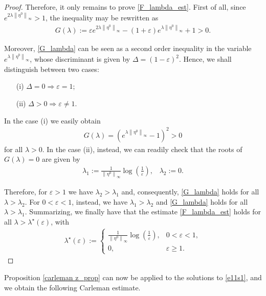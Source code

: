 \documentclass[preprint,1p]{elsarticle}
\newcommand{\D}{\displaystyle}
\newcommand{\norm}[2]{\left\|#1\right\|_{#2}}
\begin{document}
\begin{proof}
Therefore, it only remains to prove \eqref{F_lambda_est}. First of all, since $e^{2\lambda\norm{\eta^0}{\infty}}>1$, the inequality  may be rewritten as
\begin{align}\label{G_lambda}
	G(\lambda):=\varepsilon e^{2\lambda\norm{\eta^0}{\infty}} - (1+\varepsilon)e^{\lambda\norm{\eta^0}{\infty}} + 1> 0.
\end{align}

Moreover, \eqref{G_lambda} can be seen as a second order inequality in the variable $e^{\lambda\norm{\eta^0}{\infty}}$, whose discriminant is given by $\Delta = (1-\varepsilon)^2$. Hence, we shall distinguish between two cases:
\begin{itemize}
	\item[(i)] $\Delta = 0\Rightarrow \varepsilon=1$;
	\item[(ii)] $\Delta>0\Rightarrow \varepsilon\neq 1$.
\end{itemize}
In the case (i) we easily obtain 
\begin{align*}
	G(\lambda)=\left(e^{\lambda\norm{\eta^0}{\infty}}-1\right)^2>0
\end{align*} 
for all $\lambda>0$. In the case (ii), instead, we can readily check that the roots of $G(\lambda)=0$ are given by 
\begin{align*}
	\lambda_1:=\frac{1}{\norm{\eta^0}{\infty}}\log\left(\frac 1\varepsilon\right),\;\;\; \lambda_2:=0.
\end{align*}

Therefore, for $\varepsilon>1$ we have $\lambda_2>\lambda_1$ and, consequently, \eqref{G_lambda} holds for all $\lambda>\lambda_2$. For $0<\varepsilon<1$, instead, we have $\lambda_1>\lambda_2$ and \eqref{G_lambda} holds for all $\lambda>\lambda_1$. Summarizing, we finally have that the estimate \eqref{F_lambda_est} holds for all $\lambda>\lambda^\star(\varepsilon)$, with
\begin{align}\label{lambda_zero}
	\lambda^\star(\varepsilon):=\begin{cases}
	\D\frac{1}{\norm{\eta^0}{\infty}}\log\left(\frac 1\varepsilon\right), & 0<\varepsilon<1,
	\\
	0, & \varepsilon\geq 1.
	\end{cases}
\end{align}
\end{proof}

Proposition \ref{carleman z_prop} can now be applied to the solutions to \eqref{e11s1}, and we obtain the following Carleman estimate.
\end{document}
